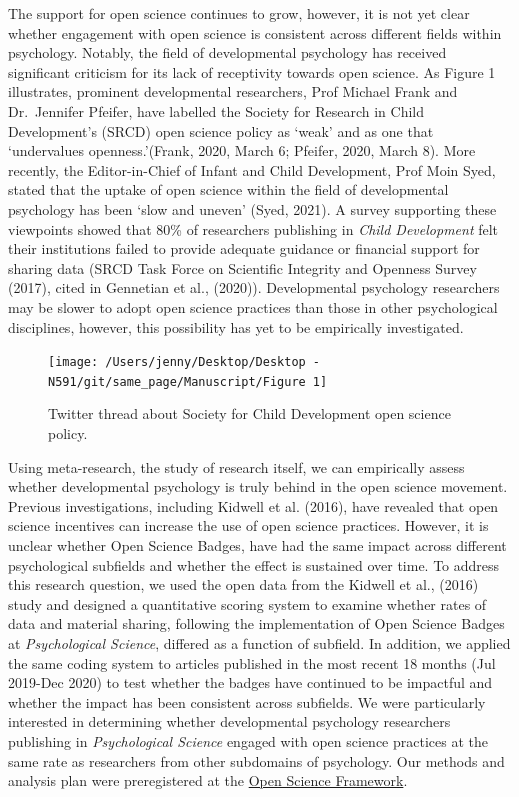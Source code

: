 \documentclass[
  english,
  man,floatsintext]{apa6}
\begin{document}
The support for open science continues to grow, however, it is not yet clear whether engagement with open science is consistent across different fields within psychology. Notably, the field of developmental psychology has received significant criticism for its lack of receptivity towards open science. As Figure 1 illustrates, prominent developmental researchers, Prof Michael Frank and Dr.~Jennifer Pfeifer, have labelled the Society for Research in Child Development's (SRCD) open science policy as `weak' and as one that `undervalues openness.'(Frank, 2020, March 6; Pfeifer, 2020, March 8). More recently, the Editor-in-Chief of Infant and Child Development, Prof Moin Syed, stated that the uptake of open science within the field of developmental psychology has been `slow and uneven' (Syed, 2021). A survey supporting these viewpoints showed that 80\% of researchers publishing in \emph{Child Development} felt their institutions failed to provide adequate guidance or financial support for sharing data (SRCD Task Force on Scientific Integrity and Openness Survey (2017), cited in Gennetian et al., (2020)). Developmental psychology researchers may be slower to adopt open science practices than those in other psychological disciplines, however, this possibility has yet to be empirically investigated.

\begin{figure}

{\centering \texttt{[image: /Users/jenny/Desktop/Desktop - N591/git/same\_page/Manuscript/Figure 1]} 

}

\caption{Twitter thread about Society for Child Development open science policy.}\label{fig:unnamed-chunk-1}
\end{figure}

Using meta-research, the study of research itself, we can empirically assess whether developmental psychology is truly behind in the open science movement. Previous investigations, including Kidwell et al. (2016), have revealed that open science incentives can increase the use of open science practices. However, it is unclear whether Open Science Badges, have had the same impact across different psychological subfields and whether the effect is sustained over time. To address this research question, we used the open data from the Kidwell et al., (2016) study and designed a quantitative scoring system to examine whether rates of data and material sharing, following the implementation of Open Science Badges at \emph{Psychological Science}, differed as a function of subfield. In addition, we applied the same coding system to articles published in the most recent 18 months (Jul 2019-Dec 2020) to test whether the badges have continued to be impactful and whether the impact has been consistent across subfields. We were particularly interested in determining whether developmental psychology researchers publishing in \emph{Psychological Science} engaged with open science practices at the same rate as researchers from other subdomains of psychology. Our methods and analysis plan were preregistered at the \href{https://osf.io/gqv9n/?view_only=b97cd4c4f6d645bc9e8870d97b6f3da4}{Open Science Framework}.
\end{document}
